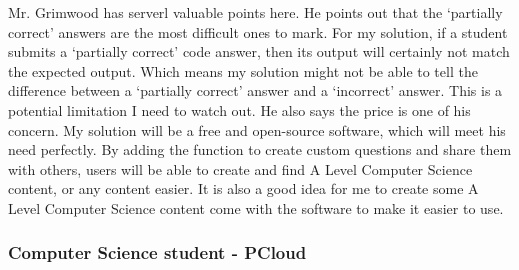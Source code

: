 \documentclass[a4paper]{report}
\begin{document}
Mr. Grimwood has serverl valuable points here. He points out that the `partially correct' answers are the most difficult ones to mark. For my solution, if a student submits a `partially correct' code answer, then its output will certainly not match the expected output. Which means my solution might not be able to tell the difference between a `partially correct' answer and a `incorrect' answer. This is a potential limitation I need to watch out. He also says the price is one of his concern. My solution will be a free and open-source software, which will meet his need perfectly. By adding the function to create custom questions and share them with others, users will be able to create and find A Level Computer Science content, or any content easier. It is also a good idea for me to create some A Level Computer Science content come with the software to make it easier to use.

\subsubsection{Computer Science student - PCloud}
\end{document}
